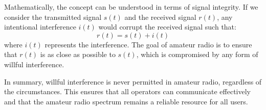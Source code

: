 Mathematically, the concept can be understood in terms of signal integrity. If we consider the transmitted signal \( s(t) \) and the received signal \( r(t) \), any intentional interference \( i(t) \) would corrupt the received signal such that:
\[ r(t) = s(t) + i(t) \]
where \( i(t) \) represents the interference. The goal of amateur radio is to ensure that \( r(t) \) is as close as possible to \( s(t) \), which is compromised by any form of willful interference.

In summary, willful interference is never permitted in amateur radio, regardless of the circumstances. This ensures that all operators can communicate effectively and that the amateur radio spectrum remains a reliable resource for all users.

